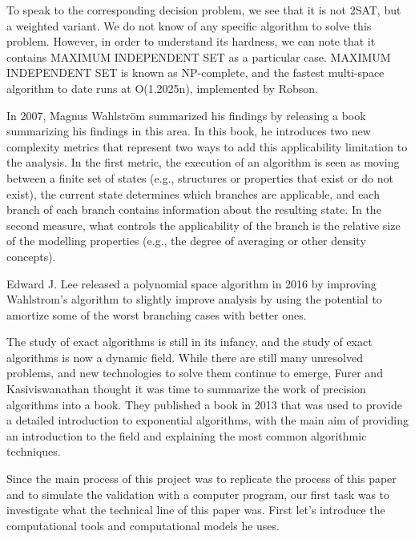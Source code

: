 \documentclass{sigchi}
\begin{document}
To speak to the corresponding decision problem, we see that it is not 2SAT, but a weighted variant. We do not know of any specific algorithm to solve this problem. However, in order to understand its hardness, we can note that it contains MAXIMUM INDEPENDENT SET as a particular case. MAXIMUM INDEPENDENT SET is known as NP-complete, and the fastest multi-space algorithm to date runs at O(1.2025n), implemented by Robson.\cite{robson2001finding}

In 2007, Magnus Wahlström summarized his findings by releasing a book summarizing his findings in this area.\cite{Wahlstrom} In this book, he introduces two new complexity metrics that represent two ways to add this applicability limitation to the analysis. In the first metric, the execution of an algorithm is seen as moving between a finite set of states (e.g., structures or properties that exist or do not exist), the current state determines which branches are applicable, and each branch of each branch contains information about the resulting state. In the second measure, what controls the applicability of the branch is the relative size of the modelling properties (e.g., the degree of averaging or other density concepts).

Edward J. Lee released a polynomial space algorithm in 2016
\cite{Lee} by improving Wahlstrom's algorithm to slightly improve analysis by using the potential to amortize some of the worst branching cases with better ones. 

The study of exact algorithms is still in its infancy, and the study of exact algorithms is now a dynamic field. While there are still many unresolved problems, and new technologies to solve them continue to emerge, Furer and Kasiviswanathan thought it was time to summarize the work of precision algorithms into a book. They published a book in 2013 that was used to provide a detailed introduction to exponential algorithms, with the main aim of providing an introduction to the field and explaining the most common algorithmic techniques.\cite{10.1145/2428556.2428575}

Since the main process of this project was to replicate the process of this paper and to simulate the validation with a computer program, our first task was to investigate what the technical line of this paper was. First let's introduce the computational tools and computational models he uses.
\end{document}

